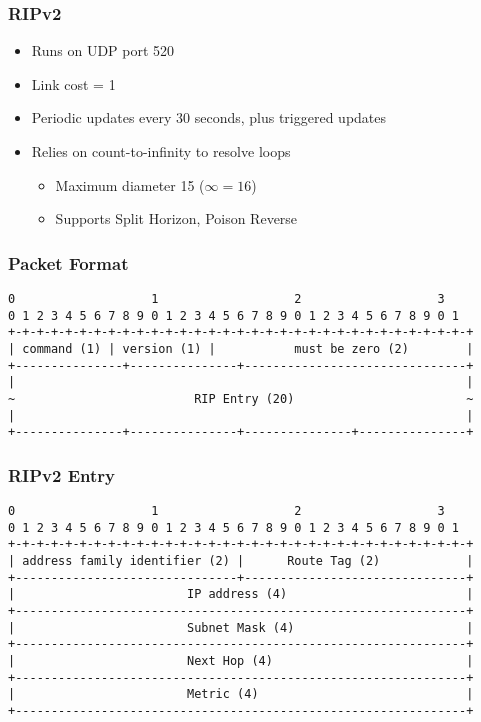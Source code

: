 \subsubsection{RIPv2}
\begin{itemize}[nosep]
    \item Runs on UDP port 520
    \item Link cost = 1
    \item Periodic updates every 30 seconds, plus triggered updates
    \item Relies on count-to-infinity to resolve loops
          \begin{itemize}[nosep]
              \item Maximum diameter 15 ($\infty = 16$)
              \item Supports Split Horizon, Poison Reverse
          \end{itemize}
\end{itemize}
\subsubsection{Packet Format}
\begin{verbatim}
0                   1                   2                   3
0 1 2 3 4 5 6 7 8 9 0 1 2 3 4 5 6 7 8 9 0 1 2 3 4 5 6 7 8 9 0 1
+-+-+-+-+-+-+-+-+-+-+-+-+-+-+-+-+-+-+-+-+-+-+-+-+-+-+-+-+-+-+-+-+
| command (1) | version (1) |           must be zero (2)        |
+---------------+---------------+-------------------------------+
|                                                               |
~                         RIP Entry (20)                        ~
|                                                               |
+---------------+---------------+---------------+---------------+
\end{verbatim}
\subsubsection{RIPv2 Entry}
\begin{verbatim}
0                   1                   2                   3
0 1 2 3 4 5 6 7 8 9 0 1 2 3 4 5 6 7 8 9 0 1 2 3 4 5 6 7 8 9 0 1
+-+-+-+-+-+-+-+-+-+-+-+-+-+-+-+-+-+-+-+-+-+-+-+-+-+-+-+-+-+-+-+-+
| address family identifier (2) |      Route Tag (2)            |
+-------------------------------+-------------------------------+
|                        IP address (4)                         |
+---------------------------------------------------------------+
|                        Subnet Mask (4)                        |
+---------------------------------------------------------------+
|                        Next Hop (4)                           |
+---------------------------------------------------------------+
|                        Metric (4)                             |
+---------------------------------------------------------------+
\end{verbatim}
